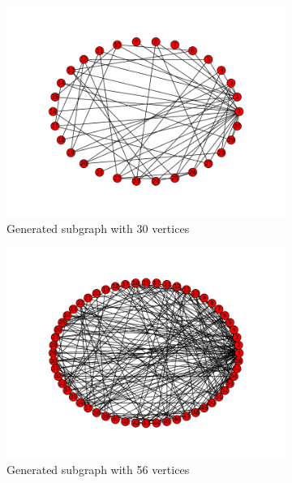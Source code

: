 \begin{figure}[!htbp]

  \begin{subfigure}[b]{0.6\textwidth}
    \includegraphics[width=\textwidth]{30}
    \caption{Generated subgraph with 30 vertices}
    \label{fig:30}
  \end{subfigure}
  \hfill
  \begin{subfigure}[b]{0.6\textwidth}
    \includegraphics[width=\textwidth]{56}
    \caption{Generated subgraph with 56 vertices}
    \label{fig:56}
  \end{subfigure}
  \begin{subfigure}[b]{0.6\textwidth}

\end{subfigure}
\end{figure}
